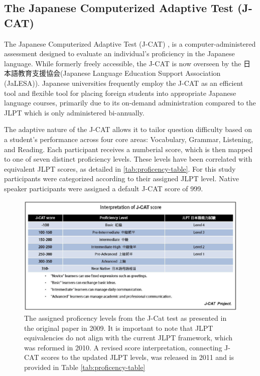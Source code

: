 \subsection{The Japanese Computerized Adaptive Test (J-CAT)}
\label{j-cat}


The Japanese Computerized Adaptive Test (J-CAT) \citep{Imai2009}, is a computer-administered assessment
designed to evaluate an
individual's proficiency in the Japanese language. While formerly freely accessible, the J-CAT is now overseen by
the  日本語教育支援協会(Japanese Language Education Support Association (JaLESA)). Japanese
universities frequently
employ the J-CAT as an efficient tool and flexible tool for placing foreign students into appropriate Japanese
language courses, primarily due to its on-demand administration compared to the JLPT which is only
administered bi-annually.

The adaptive nature of the J-CAT allows it to tailor question difficulty based on a student's performance across
four core areas: Vocabulary, Grammar, Listening, and Reading. Each participant receives a numberial score, which is
then mapped to one of seven distinct proficiency levels. These levels have been correlated with equivalent JLPT
scores, as detailed in \ref{tab:proficency-table}. For this study participants were categorized according to their
assigned JLPT level. Native speaker participants were assigned a default J-CAT score of 999.

\begin{figure}[h!]
    \centering
    \includegraphics[scale=.3]{img/JCatScores.png}
    \caption[J-Cat Proficency Levels]{The assigned proficency levels from the J-Cat test as presented in the original paper in  2009. It is important to note that JLPT equivalencies do not align with the current JLPT framework, which was reformed in 2010. A revised score interpretation, connecting J-CAT scores to the updated JLPT levels, was released in 2011 and is provided in Table \ref{tab:proficency-table} }
    \label{fig:JCatLevels}
\end{figure}



